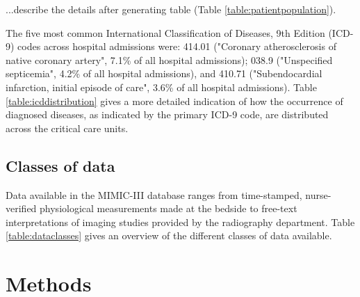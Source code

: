 \documentclass[english]{article}
\begin{document}
...describe the details after generating table (Table \ref{table:patientpopulation}).

The five most common International Classification of Diseases, 9th Edition (ICD-9) codes across hospital admissions were: 414.01 ("Coronary atherosclerosis of native coronary artery", 7.1\% of all hospital admissions); 038.9 ("Unspecified septicemia", 4.2\% of all hospital admissions), and 410.71 ("Subendocardial infarction, initial episode of care", 3.6\% of all hospital admissions). Table \ref{table:icddistribution} gives a more detailed indication of how the occurrence of diagnosed diseases, as indicated by the primary ICD-9 code, are distributed across the critical care units. 




\subsection*{Classes of data}

Data available in the MIMIC-III database ranges from time-stamped, nurse-verified physiological measurements made at the bedside to free-text interpretations of imaging studies provided by the radiography department. Table \ref{table:dataclasses} gives an overview of the different classes of data available. 

\section*{Methods}

\end{document}
